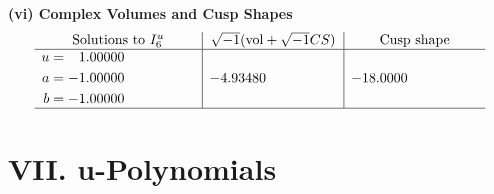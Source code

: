 \documentclass[1p]{elsarticle_modified}
\theoremstyle{definition}
\newcommand{\I}{\sqrt{-1}}
\begin{document}
\newpage\flushleft \textbf{(vi) Complex Volumes and Cusp Shapes}
$$\begin{array}{c|c|c}  
\text{Solutions to }I^u_{6}& \I (\text{vol} + \sqrt{-1}CS) & \text{Cusp shape}\\
 \hline 
\begin{aligned}
u &= \phantom{-}1.00000\phantom{ +0.000000I} \\
a &= -1.00000\phantom{ +0.000000I} \\
b &= -1.00000\phantom{ +0.000000I}\end{aligned}
 & -4.93480\phantom{ +0.000000I} & -18.0000\phantom{ +0.000000I}\\
 \hline 
 \end{array}$$\newpage
\newpage\renewcommand{\arraystretch}{1}
\centering \section*{ VII. u-Polynomials}
\end{document}
